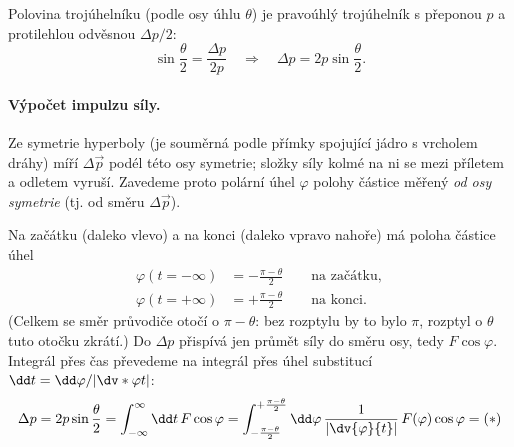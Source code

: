 Polovina trojúhelníku (podle osy úhlu $\theta$) je pravoúhlý trojúhelník s přeponou $p$ a protilehlou odvěsnou $\Delta p/2$:
\begin{equation}
  \sin\frac{\theta}{2} = \frac{\Delta p}{2p} \quad\Longrightarrow\quad \Delta p = 2p\sin\frac{\theta}{2}.
\end{equation}

\paragraph{Výpočet impulzu síly.}
Ze symetrie hyperboly (je souměrná podle přímky spojující jádro s vrcholem dráhy) míří $\Delta\vec p$ podél této osy symetrie; složky síly kolmé na ni se mezi příletem a odletem vyruší. Zavedeme proto polární úhel $\varphi$ polohy částice měřený \emph{od osy symetrie} (tj. od směru $\Delta\vec p$).

\begin{center}
\end{center}

Na začátku (daleko vlevo) a na konci (daleko vpravo nahoře) má poloha částice úhel
\begin{align}
  \varphi(t=-\infty) &= -\frac{\pi-\theta}{2} \qquad\text{na začátku},\\
  \varphi(t=+\infty) &= +\frac{\pi-\theta}{2} \qquad\text{na konci}.
\end{align}
(Celkem se směr průvodiče otočí o $\pi-\theta$: bez rozptylu by to bylo $\pi$, rozptyl o $\theta$ tuto otočku zkrátí.)
Do $\Delta p$ přispívá jen průmět síly do směru osy, tedy $F\cos\varphi$. Integrál přes čas převedeme na integrál přes úhel substitucí $\dd t = \dd\varphi / |\dv*{\varphi}{t}|$:
\begin{equation}
  \Delta p = 2p\sin\frac{\theta}{2} = \int_{-\infty}^{\infty}\dd t\, F\cos\varphi
  = \int_{-\frac{\pi-\theta}{2}}^{+\frac{\pi-\theta}{2}} \dd\varphi\, \frac{1}{\left|\dv{\varphi}{t}\right|}\, F(\varphi)\cos\varphi = (*)
\end{equation}


